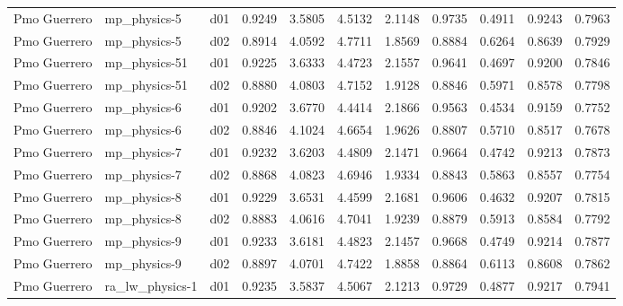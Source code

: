 \begin{longtable}{lllrrrrrrrr}
         Pmo Guerrero  &          mp\_physics-5 &     d01 &   0.9249 &   3.5805 &   4.5132 &       2.1148 &        0.9735 &       0.4911 &           0.9243 &  0.7963 \\
         Pmo Guerrero  &          mp\_physics-5 &     d02 &   0.8914 &   4.0592 &   4.7711 &       1.8569 &        0.8884 &       0.6264 &           0.8639 &  0.7929 \\
         Pmo Guerrero  &         mp\_physics-51 &     d01 &   0.9225 &   3.6333 &   4.4723 &       2.1557 &        0.9641 &       0.4697 &           0.9200 &  0.7846 \\
         Pmo Guerrero  &         mp\_physics-51 &     d02 &   0.8880 &   4.0803 &   4.7152 &       1.9128 &        0.8846 &       0.5971 &           0.8578 &  0.7798 \\
         Pmo Guerrero  &          mp\_physics-6 &     d01 &   0.9202 &   3.6770 &   4.4414 &       2.1866 &        0.9563 &       0.4534 &           0.9159 &  0.7752 \\
         Pmo Guerrero  &          mp\_physics-6 &     d02 &   0.8846 &   4.1024 &   4.6654 &       1.9626 &        0.8807 &       0.5710 &           0.8517 &  0.7678 \\
         Pmo Guerrero  &          mp\_physics-7 &     d01 &   0.9232 &   3.6203 &   4.4809 &       2.1471 &        0.9664 &       0.4742 &           0.9213 &  0.7873 \\
         Pmo Guerrero  &          mp\_physics-7 &     d02 &   0.8868 &   4.0823 &   4.6946 &       1.9334 &        0.8843 &       0.5863 &           0.8557 &  0.7754 \\
         Pmo Guerrero  &          mp\_physics-8 &     d01 &   0.9229 &   3.6531 &   4.4599 &       2.1681 &        0.9606 &       0.4632 &           0.9207 &  0.7815 \\
         Pmo Guerrero  &          mp\_physics-8 &     d02 &   0.8883 &   4.0616 &   4.7041 &       1.9239 &        0.8879 &       0.5913 &           0.8584 &  0.7792 \\
         Pmo Guerrero  &          mp\_physics-9 &     d01 &   0.9233 &   3.6181 &   4.4823 &       2.1457 &        0.9668 &       0.4749 &           0.9214 &  0.7877 \\
         Pmo Guerrero  &          mp\_physics-9 &     d02 &   0.8897 &   4.0701 &   4.7422 &       1.8858 &        0.8864 &       0.6113 &           0.8608 &  0.7862 \\
         Pmo Guerrero  &       ra\_lw\_physics-1 &     d01 &   0.9235 &   3.5837 &   4.5067 &       2.1213 &        0.9729 &       0.4877 &           0.9217 &  0.7941 \\

\end{longtable}
